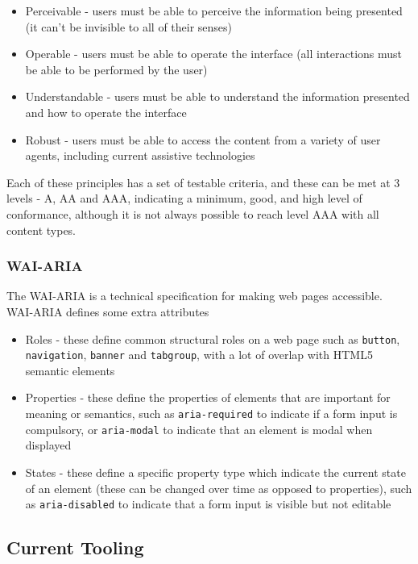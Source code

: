 \documentclass[ %
                    author={Aleena Baig},
                supervisor={Dr Simon Lock},
                    degree={BSc},
                     title={On Making Web Accessible Graphs},
                  subtitle={},
                      year={2019} ]{dissertation}
\begin{document}
\begin{itemize}
    \item Perceivable - users must be able to perceive the information being presented (it can't be invisible to all of their senses)
    \item Operable - users must be able to operate the interface (all interactions must be able to be performed by the user)
    \item Understandable - users must be able to understand the information presented and how to operate the interface
    \item Robust - users must be able to access the content from a variety of user agents, including current assistive technologies
\end{itemize}
%
Each of these principles has a set of testable criteria, and these can be met at 3 levels - A, AA and AAA, indicating a minimum, good, and high level of conformance, although it is not always possible to reach level AAA with all content types.

\subsubsection{WAI-ARIA}

The WAI-ARIA is a technical specification for making web pages accessible. WAI-ARIA defines some extra attributes

\begin{itemize}
    \item Roles - these define common structural roles on a web page such as \texttt{button}, \texttt{navigation}, \texttt{banner} and \texttt{tabgroup}, with a lot of overlap with HTML5 semantic elements
    \item Properties - these define the properties of elements that are important for meaning or semantics, such as \texttt{aria-required} to indicate if a form input is compulsory, or \texttt{aria-modal} to indicate that an element is modal when displayed
    \item States - these define a specific property type which indicate the current state of an element (these can be changed over time as opposed to properties), such as \texttt{aria-disabled} to indicate that a form input is visible but not editable
\end{itemize}

\subsection{Current Tooling}
\end{document}

